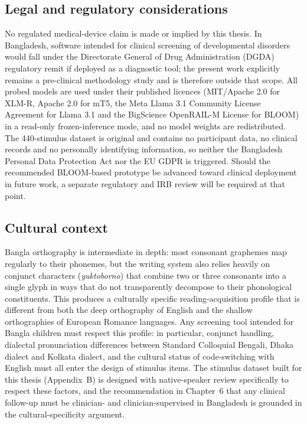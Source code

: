 \subsection*{Legal and regulatory considerations}

No regulated medical-device claim is made or implied by this thesis. In Bangladesh, software intended for clinical screening of developmental disorders would fall under the Directorate General of Drug Administration (DGDA) regulatory remit if deployed as a diagnostic tool; the present work explicitly remains a pre-clinical methodology study and is therefore outside that scope. All probed models are used under their published licences (MIT/Apache 2.0 for XLM-R, Apache 2.0 for mT5, the Meta Llama 3.1 Community License Agreement for Llama 3.1 and the BigScience OpenRAIL-M License for BLOOM) in a read-only frozen-inference mode, and no model weights are redistributed. The 440-stimulus dataset is original and contains no participant data, no clinical records and no personally identifying information, so neither the Bangladesh Personal Data Protection Act nor the EU GDPR is triggered. Should the recommended BLOOM-based prototype be advanced toward clinical deployment in future work, a separate regulatory and IRB review will be required at that point.

\subsection*{Cultural context}

Bangla orthography is intermediate in depth: most consonant graphemes map regularly to their phonemes, but the writing system also relies heavily on conjunct characters (\textit{yuktoborno}) that combine two or three consonants into a single glyph in ways that do not transparently decompose to their phonological constituents. This produces a culturally specific reading-acquisition profile that is different from both the deep orthography of English and the shallow orthographies of European Romance languages. Any screening tool intended for Bangla children must respect this profile: in particular, conjunct handling, dialectal pronunciation differences between Standard Colloquial Bengali, Dhaka dialect and Kolkata dialect, and the cultural status of code-switching with English must all enter the design of stimulus items. The stimulus dataset built for this thesis (Appendix~B) is designed with native-speaker review specifically to respect these factors, and the recommendation in Chapter~6 that any clinical follow-up must be clinician- and clinician-supervised in Bangladesh is grounded in the cultural-specificity argument.

